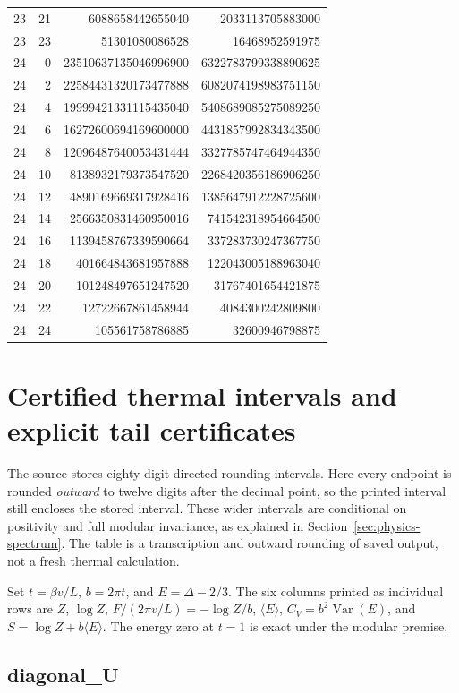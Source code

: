 \begin{longtable}{@{}rrrr@{}}
23 & 21 & 6088658442655040 & 2033113705883000\\
23 & 23 & 51301080086528 & 16468952591975\\
24 & 0 & 23510637135046996900 & 6322783799338890625\\
24 & 2 & 22584431320173477888 & 6082074198983751150\\
24 & 4 & 19999421331115435040 & 5408689085275089250\\
24 & 6 & 16272600694169600000 & 4431857992834343500\\
24 & 8 & 12096487640053431444 & 3327785747464944350\\
24 & 10 & 8138932179373547520 & 2268420356186906250\\
24 & 12 & 4890169669317928416 & 1385647912228725600\\
24 & 14 & 2566350831460950016 & 741542318954664500\\
24 & 16 & 1139458767339590664 & 337283730247367750\\
24 & 18 & 401664843681957888 & 122043005188963040\\
24 & 20 & 101248497651247520 & 31767401654421875\\
24 & 22 & 12722667861458944 & 4084300242809800\\
24 & 24 & 105561758786885 & 32600946798875\\
\end{longtable}
\endgroup
\section{Certified thermal intervals and explicit tail certificates}
\label{expdata:thermal}
The source  stores
eighty-digit directed-rounding intervals. Here every endpoint is rounded
\emph{outward} to twelve digits after the decimal point, so the printed
interval still encloses the stored interval. These wider intervals are
conditional on positivity and full modular invariance, as explained in
Section~\ref{sec:physics-spectrum}. The table is a transcription and
outward rounding of saved output, not a fresh thermal calculation.

Set $t=\beta v/L$, $b=2\pi t$, and $E=\Delta-2/3$.
The six columns printed as individual rows are $Z$, $\log Z$,
$F/(2\pi v/L)=-\log Z/b$, $\langle E\rangle$,
$C_V=b^2\operatorname{Var}(E)$, and $S=\log Z+b\langle E\rangle$.
The energy zero at $t=1$ is exact under the modular premise.
\subsection{diagonal\_U}

